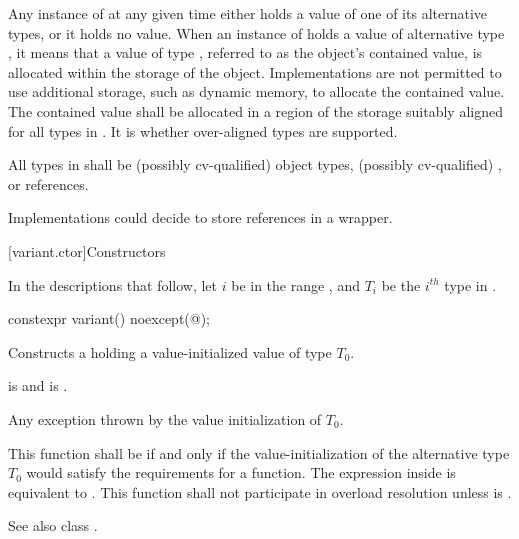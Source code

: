\pnum
Any instance of  at any given time either holds a value
of one of its alternative types, or it holds no value.
When an instance of  holds a value of alternative type ,
it means that a value of type , referred to as the 
object's contained value, is allocated within the storage of the
 object.
Implementations are not permitted to use additional storage, such as dynamic
memory, to allocate the contained value.
The contained value shall be allocated in a region of the 
storage suitably aligned for all types in .
It is 
whether over-aligned types are supported.

\pnum
All types in  shall be (possibly cv-qualified)
object types, (possibly cv-qualified) , or references.
\begin{note}
Implementations could decide to store references in a wrapper.
\end{note}

[variant.ctor]{Constructors}

\pnum
In the descriptions that follow, let $i$ be in the range ,
and $T_i$ be the $i^{th}$ type in .

%
\begin{itemdecl}
constexpr variant() noexcept(@\seebelow@);
\end{itemdecl}

\begin{itemdescr}
\pnum
\effects
Constructs a  holding a value-initialized value of type $T_0$.

\pnum
\postconditions
{} is  and  is .

\pnum
\throws
Any exception thrown by the value initialization of $T_0$.

\pnum
\remarks
This function shall be  if and only if the
value-initialization of the alternative type $T_0$ would satisfy the
requirements for a  function.
The expression inside  is equivalent to
.
This function shall not participate in overload resolution unless
 is .
\begin{note} See also class . \end{note}
\end{itemdescr}

